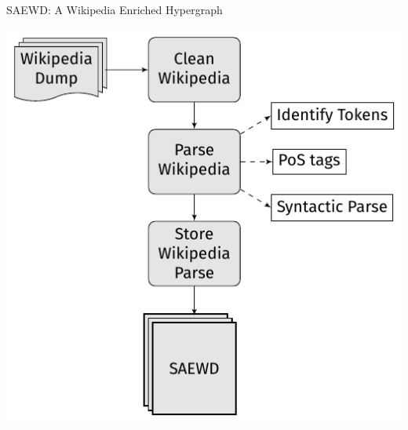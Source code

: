 \documentclass[10pt,xcolor=table]{beamer}
\begin{document}
\begin{frame}{SAEWD: A Wikipedia Enriched Hypergraph}
\begin{center}
\includegraphics[width=.7\linewidth]{image2/Chapitre3/flow_chart.pdf}
\end{center}

 \vspace{\textheight}
\end{frame} 
\end{document}
